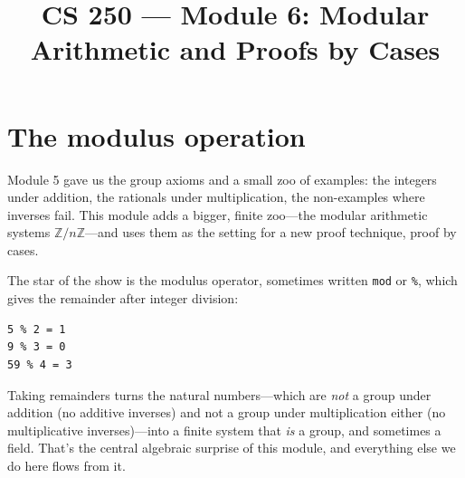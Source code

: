\documentclass[11pt]{article}
\title{CS 250 --- Module 6: Modular Arithmetic and Proofs by Cases}
\author{}
\date{}
\begin{document}
\maketitle

\begin{readingmap}




\end{readingmap}

\section{The modulus operation}
Module 5 gave us the group axioms and a small zoo of examples: the integers under addition, the rationals under multiplication, the non-examples where inverses fail. This module adds a bigger, finite zoo---the modular arithmetic systems $\mathbb{Z}/n\mathbb{Z}$---and uses them as the setting for a new proof technique, proof by cases.

The star of the show is the modulus operator, sometimes written \texttt{mod} or \texttt{\%}, which gives the remainder after integer division:
\begin{lstlisting}
5 % 2 = 1
9 % 3 = 0
59 % 4 = 3
\end{lstlisting}
Taking remainders turns the natural numbers---which are \emph{not} a group under addition (no additive inverses) and not a group under multiplication either (no multiplicative inverses)---into a finite system that \emph{is} a group, and sometimes a field. That's the central algebraic surprise of this module, and everything else we do here flows from it.
\end{document}
